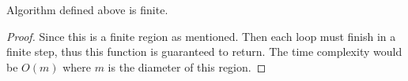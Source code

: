\begin{theorem}
    Algorithm defined above is finite.
\end{theorem}

\begin{proof}
    Since this is a finite region as mentioned. 
    Then each loop must finish in a finite step, thus this function is guaranteed to return.
    The time complexity would be $O(m)$ where $m$ is the diameter of this region.
\end{proof}


